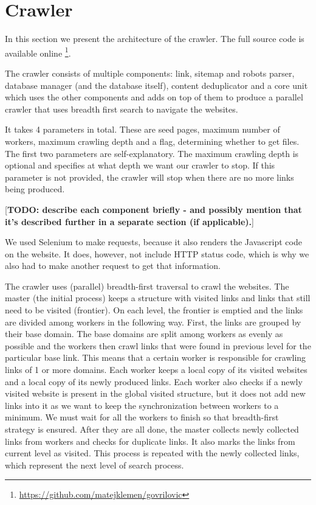 \documentclass[9pt]{IEEEtran}
\begin{document}
\section{Crawler}
In this section we present the architecture of the crawler. 
The full source code is available online \footnote{\url{https://github.com/matejklemen/govrilovic}}.

The crawler consists of multiple components: link, sitemap and robots parser, database manager (and the database itself), content deduplicator and a core unit which uses the other components and adds on top of them to produce a parallel crawler that uses breadth first search to navigate the websites.

It takes 4 parameters in total. These are seed pages, maximum number of workers, maximum crawling depth and a flag, determining whether to get files. 
The first two parameters are self-explanatory.
The maximum crawling depth is optional and specifies at what depth we want our crawler to stop. 
If this parameter is not provided, the crawler will stop when there are no more links being produced.

[\textbf{TODO: describe each component briefly - and possibly mention that it's described further in a separate section (if applicable).}]

We used Selenium to make requests, because it also renders the Javascript code on the website. It does, however, not include HTTP status code, which is why we also had to make another request to get that information.

The crawler uses (parallel) breadth-first traversal to crawl the websites. The master (the initial process) keeps a structure with visited links and links that still need to be visited (frontier).
On each level, the frontier is emptied and the links are divided among workers in the following way.
First, the links are grouped by their base domain.
The base domains are split among workers as evenly as possible and the workers then crawl links that were found in previous level for the particular base link.
This means that a certain worker is responsible for crawling links of 1 or more domains.
Each worker keeps a local copy of its visited websites and a local copy of its newly produced links.
Each worker also checks if a newly visited website is present in the global visited structure, but it does not add new links into it as we want to keep the synchronization between workers to a minimum.
We must wait for all the workers to finish so that breadth-first strategy is ensured.
After they are all done, the master collects newly collected links from workers and checks for duplicate links.
It also marks the links from current level as visited.
This process is repeated with the newly collected links, which represent the next level of search process.
\end{document}
